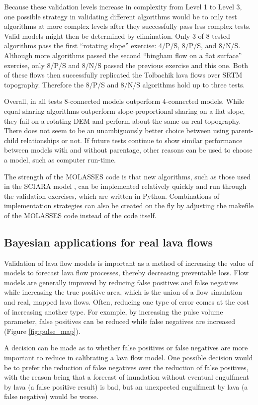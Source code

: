 	Because these validation levels increase in complexity from Level 1 to Level 3, one possible strategy in validating different algorithms would be to only test algorithms at more complex levels after they successfully pass less complex tests. Valid models might then be determined by elimination. Only 3 of 8 tested algorithms pass the first ``rotating slope'' exercise: 4/P/S, 8/P/S, and 8/N/S. Although more algorithms passed the second ``bingham flow on a flat surface'' exercise, only 8/P/S and 8/N/S passed the previous exercise and this one. Both of these flows then successfully replicated the Tolbachik lava flows over SRTM topography. Therefore the 8/P/S and 8/N/S algorithms hold up to three tests.
	
	Overall, in all tests 8-connected models outperform 4-connected models. While equal sharing algorithms outperform slope-proportional sharing on a flat slope, they fail on a rotating DEM and perform about the same on real topography. There does not seem to be an unambiguously better choice between using parent-child relationships or not. If future tests continue to show similar performance between models with and without parentage, other reasons can be used to choose a model, such as computer run-time. 
	
	The strength of the MOLASSES code is that new algorithms, such as those used in the SCIARA model \citep{crisci2004simulation}, can be implemented relatively quickly and run through the validation exercises, which are written in Python. Combinations of implementation strategies can also be created on the fly by adjusting the makefile of the MOLASSES code instead of the code itself.

	\subsection{Bayesian applications for real lava flows}
		Validation of lava flow models is important as a method of increasing the value of models to forecast lava flow processes, thereby decreasing preventable loss. Flow models are generally improved by reducing false positives and false negatives while increasing the true positive area, which is the union of a flow simulation and real, mapped lava flows. Often, reducing one type of error comes at the cost of increasing another type. For example, by increasing the pulse volume parameter, false positives can be reduced while false negatives are increased (Figure \ref{fig:pulse_map}).
		
		A decision can be made as to whether false positives or false negatives are more important to reduce in calibrating a lava flow model. One possible decision would be to prefer the reduction of false negatives over the reduction of false positives, with the reason being that a forecast of inundation without eventual engulfment by lava (a false positive result) is bad, but an unexpected engulfment by lava (a false negative) would be worse.
		
